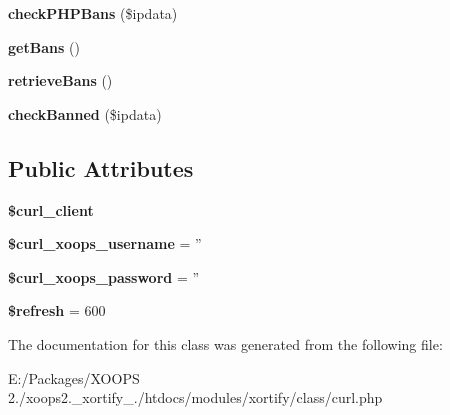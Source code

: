 \begin{DoxyCompactItemize}
\item 
\hypertarget{class_c_u_r_l_xortify_exchange_af7070ec0dd7e10f2245ee61493232545}{{\bfseries check\-P\-H\-P\-Bans} (\$ipdata)}\label{class_c_u_r_l_xortify_exchange_af7070ec0dd7e10f2245ee61493232545}

\item 
\hypertarget{class_c_u_r_l_xortify_exchange_ab16e33134365a9f5e81f903181e4b02f}{{\bfseries get\-Bans} ()}\label{class_c_u_r_l_xortify_exchange_ab16e33134365a9f5e81f903181e4b02f}

\item 
\hypertarget{class_c_u_r_l_xortify_exchange_a371fa06384f7dc24403f6bfd6e6829e7}{{\bfseries retrieve\-Bans} ()}\label{class_c_u_r_l_xortify_exchange_a371fa06384f7dc24403f6bfd6e6829e7}

\item 
\hypertarget{class_c_u_r_l_xortify_exchange_a88c3dc6fdb84cee28548278a973ee2df}{{\bfseries check\-Banned} (\$ipdata)}\label{class_c_u_r_l_xortify_exchange_a88c3dc6fdb84cee28548278a973ee2df}

\end{DoxyCompactItemize}
\subsection*{Public Attributes}
\begin{DoxyCompactItemize}
\item 
\hypertarget{class_c_u_r_l_xortify_exchange_a807f4adb89c5b11e2eedb8a1447be62b}{{\bfseries \$curl\-\_\-client}}\label{class_c_u_r_l_xortify_exchange_a807f4adb89c5b11e2eedb8a1447be62b}

\item 
\hypertarget{class_c_u_r_l_xortify_exchange_a3049ba20cd47f4545ad2174791f4d6fd}{{\bfseries \$curl\-\_\-xoops\-\_\-username} = ''}\label{class_c_u_r_l_xortify_exchange_a3049ba20cd47f4545ad2174791f4d6fd}

\item 
\hypertarget{class_c_u_r_l_xortify_exchange_a3e18f92cce10d0f9c591e7fededc8f32}{{\bfseries \$curl\-\_\-xoops\-\_\-password} = ''}\label{class_c_u_r_l_xortify_exchange_a3e18f92cce10d0f9c591e7fededc8f32}

\item 
\hypertarget{class_c_u_r_l_xortify_exchange_abd144396bf1953b9ccc48f1333091fc8}{{\bfseries \$refresh} = 600}\label{class_c_u_r_l_xortify_exchange_abd144396bf1953b9ccc48f1333091fc8}

\end{DoxyCompactItemize}


The documentation for this class was generated from the following file\-:\begin{DoxyCompactItemize}
\item 
E\-:/\-Packages/\-X\-O\-O\-P\-S 2./xoops2.\-\_\-xortify\-\_./htdocs/modules/xortify/class/curl.\-php\end{DoxyCompactItemize}
